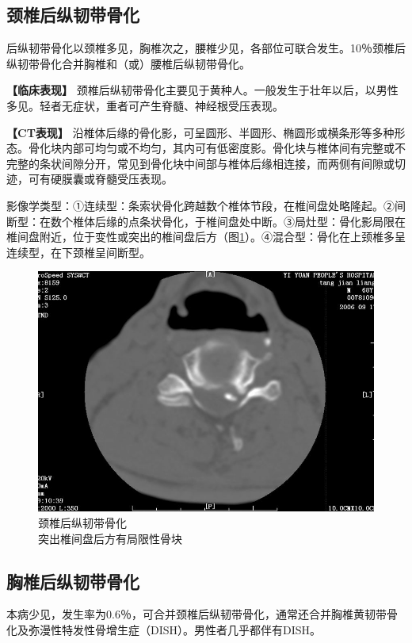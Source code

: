 \subsection{颈椎后纵韧带骨化}

后纵韧带骨化以颈椎多见，胸椎次之，腰椎少见，各部位可联合发生。10％颈椎后纵韧带骨化合并胸椎和（或）腰椎后纵韧带骨化。

\textbf{【临床表现】}
颈椎后纵韧带骨化主要见于黄种人。一般发生于壮年以后，以男性多见。轻者无症状，重者可产生脊髓、神经根受压表现。

\textbf{【CT表现】}
沿椎体后缘的骨化影，可呈圆形、半圆形、椭圆形或横条形等多种形态。骨化块内部可均匀或不均匀，其内可有低密度影。骨化块与椎体间有完整或不完整的条状间隙分开，常见到骨化块中间部与椎体后缘相连接，而两侧有间隙或切迹，可有硬膜囊或脊髓受压表现。

影像学类型：①连续型：条索状骨化跨越数个椎体节段，在椎间盘处略隆起。②间断型：在数个椎体后缘的点条状骨化，于椎间盘处中断。③局灶型：骨化影局限在椎间盘附近，位于变性或突出的椎间盘后方（图\ref{fig23-13}）。④混合型：骨化在上颈椎多呈连续型，在下颈椎呈间断型。

\begin{figure}[!htbp]
 \centering
 \includegraphics[width=.7\textwidth,height=\textheight,keepaspectratio]{./images/Image00476.jpg}
 \captionsetup{justification=centering}
 \caption{颈椎后纵韧带骨化\\{\small 突出椎间盘后方有局限性骨块}}
 \label{fig23-13}
  \end{figure} 

\subsection{胸椎后纵韧带骨化}

本病少见，发生率为0.6％，可合并颈椎后纵韧带骨化，通常还合并胸椎黄韧带骨化及弥漫性特发性骨增生症（DISH）。男性者几乎都伴有DISH。

